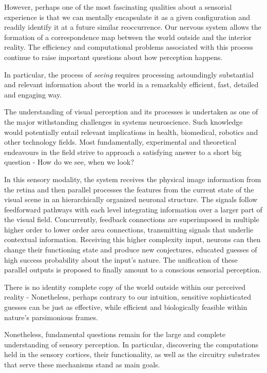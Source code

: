 However, perhaps one of the most fascinating qualities about a sensorial experience is that we can mentally encapsulate it as a given configuration and readily identify it at a future similar reoccurrence. Our nervous system allows the formation of a correspondence map between the world outside and the interior reality. The efficiency and computational problems associated with this process continue to raise important questions about how perception happens.

In particular, the process of \textit{seeing} requires processing astoundingly substantial and relevant information about the world in a remarkably efficient, fast, detailed and engaging way.

The understanding of visual perception and its processes is undertaken as one of the major withstanding challenges in systems neuroscience. Such knowledge would potentially entail relevant implications in health, biomedical, robotics and other technology fields. Most fundamentally, experimental and theoretical endeavours in the field strive to approach a satisfying answer to a short big question - How do we see, when we look?

In this sensory modality, the system receives the physical image information from the retina and then parallel processes the features from the current state of the visual scene in an hierarchically organized neuronal structure. The signals follow feedforward pathways with each level integrating information over a larger part of the visual field. Concurrently, feedback connections are superimposed in multiple higher order to lower order area connections, transmitting signals that underlie contextual information. Receiving this higher complexity input, neurons can then change their functioning state and produce new conjectures, educated guesses of high success probability about the input's nature. 
The unification of these parallel outputs is proposed to finally amount to a conscious sensorial perception.

There is no identity complete copy of the world outside within our perceived reality - Nonetheless, perhaps contrary to our intuition, sensitive sophisticated guesses can be just as effective, while efficient and biologically feasible within nature's parsimonious frames.

Nonetheless, fundamental questions remain for the large and complete understanding of sensory perception. In particular, discovering the computations held in the sensory cortices, their functionality, as well as the circuitry substrates that serve these mechanisms stand as main goals.

